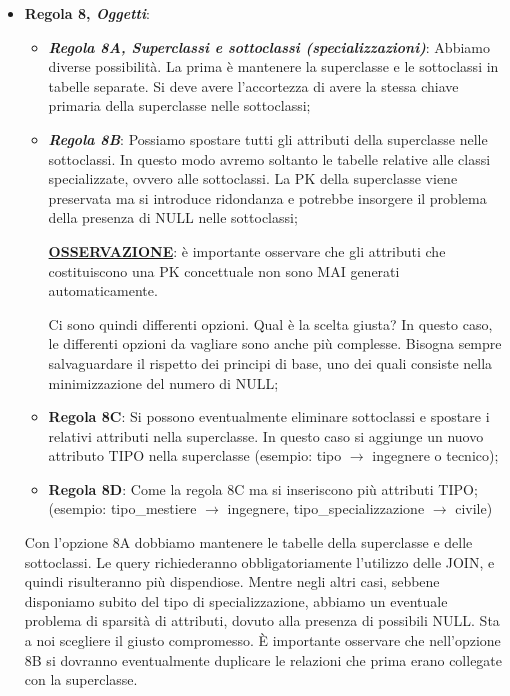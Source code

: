 \begin{itemize}
\item{\textbf{Regola 8, \textit{Oggetti}}}:

\begin{itemize} 
\item{\textbf{\textit{Regola 8A, \textit{Superclassi e sottoclassi (specializzazioni)}}}}: Abbiamo diverse possibilità. La prima è mantenere la superclasse e le sottoclassi in tabelle separate. Si deve avere l'accortezza di avere la stessa chiave primaria della superclasse nelle sottoclassi;  

\item{\textbf{\textit{Regola 8B}}}: Possiamo spostare tutti gli attributi della superclasse nelle sottoclassi. In questo modo avremo soltanto le tabelle relative alle classi specializzate, ovvero alle sottoclassi. La PK della superclasse viene preservata ma si introduce ridondanza e potrebbe insorgere il problema della presenza di NULL nelle sottoclassi;

\underline{\textbf{OSSERVAZIONE​}}: è importante osservare che gli attributi che costituiscono una PK concettuale non sono MAI generati automaticamente.  

Ci sono quindi differenti opzioni. Qual è la scelta giusta? In questo caso, le differenti opzioni da vagliare sono anche più complesse. Bisogna sempre salvaguardare il rispetto dei principi di base, uno dei quali consiste nella minimizzazione del numero di NULL;  

\item{\textbf{Regola 8C}}: Si possono eventualmente eliminare sottoclassi e spostare i relativi attributi nella superclasse. In questo caso si aggiunge un nuovo attributo TIPO nella superclasse (esempio: tipo $\rightarrow$ ingegnere o tecnico);  

\item{\textbf{Regola 8D}}: Come la regola 8C ma si inseriscono più attributi TIPO; (esempio: tipo\_mestiere $\rightarrow$ ingegnere, tipo\_specializzazione $\rightarrow$ civile)

\end{itemize}
  
Con l'opzione 8A dobbiamo mantenere le tabelle della superclasse e delle sottoclassi. Le query richiederanno obbligatoriamente l'utilizzo delle JOIN, e quindi risulteranno più dispendiose. Mentre negli altri casi, sebbene disponiamo subito del tipo di specializzazione, abbiamo un eventuale problema di sparsità di attributi, dovuto alla presenza di possibili NULL. Sta a noi scegliere il giusto compromesso. \`E importante osservare che nell'opzione 8B si dovranno eventualmente duplicare le relazioni che prima erano collegate con la superclasse.


\end{itemize}
